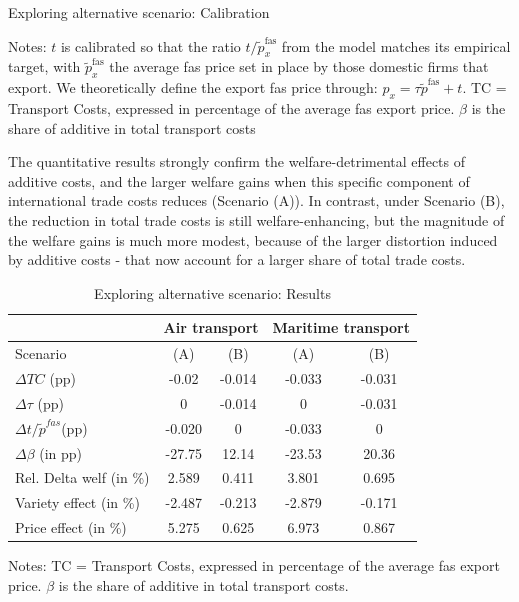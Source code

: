 \documentclass[a4paper,11pt]{article}
\begin{document}
\begin{table}[htb]
  \centering
  \caption{Exploring alternative scenario: Calibration }\label{tab:calib_TC_appendix}
\begin{center}
	
\end{center}
{\parbox[l]{13cm}{ \vspace{4pt}\footnotesize{Notes: $t$ is calibrated so that the ratio $t/\widetilde{p}^{\text{fas}}_x$ from the model matches its empirical target, with $\widetilde{p}^{\text{fas}}_x$ the average fas price set in place by those domestic firms that export. We theoretically define the export fas price through: $p_x = \tau \widetilde{p}^{\text{fas}} +t$. TC = Transport Costs, expressed in percentage of the average fas export price. $\beta$ is the share of additive in total transport costs}}}
\end{table}


The quantitative results strongly confirm the welfare-detrimental effects of additive costs, and the larger welfare gains when this specific component of international trade costs reduces (Scenario (A)). In contrast, under Scenario (B), the reduction in total trade costs is still welfare-enhancing, but the magnitude of the welfare gains is much more modest, because of the larger distortion induced by additive costs - that now account for a larger share of total trade costs.

\begin{table}[htb]
  \centering
  \caption{Exploring alternative scenario: Results }\label{tab:results_model_appendix}
\begin{center}
\begin{tabular}{l|cc|cc}
\hline \hline
& \multicolumn{2}{|c|}{Air transport} & \multicolumn{2}{|c}{Maritime transport} \\ \hline
Scenario & (A) & (B) & (A) & (B) \\ \hline
$\Delta TC$ (pp)&	-0.02	&-0.014	&-0.033&	-0.031 \\
$\Delta \tau$ (pp)&	0	&-0.014&	0&	-0.031 \\
$\Delta t/\widetilde{p}^{fas} $(pp)&	-0.020	&0	&-0.033&	0 \\
$\Delta \beta$ (in pp)	&-27.75&	12.14	&-23.53&	20.36 \\ \hline
Rel. Delta welf (in \%)&	2.589&	0.411	&3.801	&0.695 \\
Variety effect (in \%)	&-2.487&	-0.213&	-2.879	&-0.171 \\
Price effect (in \%)	&5.275	&0.625&	6.973	&0.867 \\
\hline \hline
\end{tabular}
\end{center}
{\parbox[l]{10cm}{ \vspace{4pt}\footnotesize{Notes: TC = Transport Costs, expressed in percentage of the average fas export price. $\beta$ is the share of additive in total transport costs.}}}
\end{table}
\end{document}
